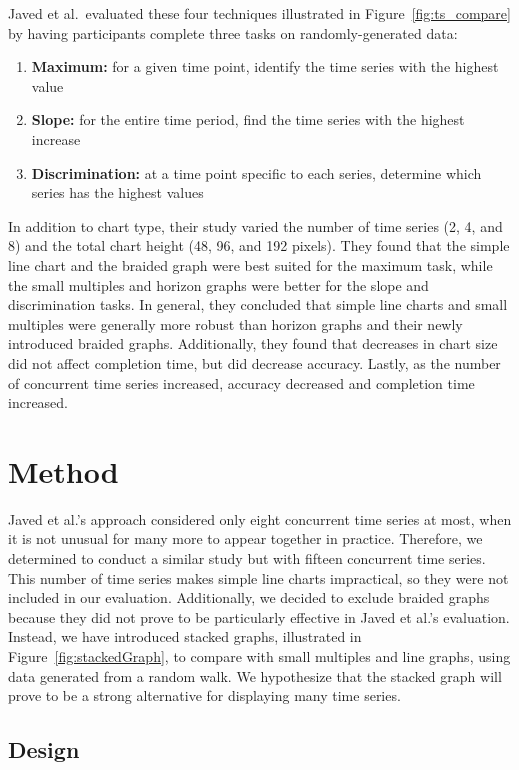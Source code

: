\documentclass{article}
\begin{document}
Javed et al.\ evaluated these four techniques illustrated in Figure~\ref{fig:ts_compare} by having participants complete three tasks on randomly-generated data:
\begin{enumerate}
	\item \textbf{Maximum:} for a given time point, identify the time series with the highest value
	\item \textbf{Slope:} for the entire time period, find the time series with the highest increase
	\item \textbf{Discrimination:} at a time point specific to each series, determine which series has the highest values
\end{enumerate}
In addition to chart type, their study varied the number of time series (2, 4, and 8) and the total chart height (48, 96, and 192 pixels).  They found that the simple line chart and the braided graph were best suited for the maximum task, while the small multiples and horizon graphs were better for the slope and discrimination tasks.  In general, they concluded that simple line charts and small multiples were generally more robust than horizon graphs and their newly introduced braided graphs. Additionally, they found that decreases in chart size did not affect completion time, but did decrease accuracy.  Lastly, as the number of concurrent time series increased, accuracy decreased and completion time increased. 

\section{Method}

Javed et al.'s approach considered only eight concurrent time series at most, when it is not unusual for many more to appear together in practice.  Therefore, we determined to conduct a similar study but with fifteen concurrent time series.  This number of time series makes simple line charts impractical, so they were not included in our evaluation.  Additionally, we decided to exclude braided graphs because they did not prove to be particularly effective in Javed et al.'s evaluation.  Instead, we have introduced stacked graphs, illustrated in Figure~\ref{fig:stackedGraph}, to compare with small multiples and line graphs, using data generated from a random walk.  We hypothesize that the stacked graph will prove to be a strong alternative for displaying many time series.

\subsection{Design}
\end{document}
